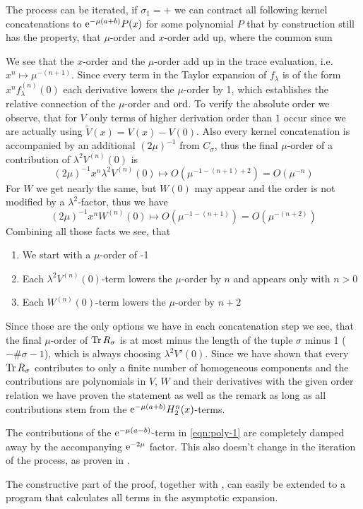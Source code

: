 \begin{MainTheorem}
\begin{Proof}
    The process can be iterated, if $\sigma_1 = +$ we can contract all following
    kernel concatenations to $\mathrm e^{-\mu(a+b)} P(x)$ for some polynomial $P$ that
    by construction still has the property, that $\mu$-order and $x$-order add
    up, where the common sum 

    We see that the $x$-order and the $\mu$-order add up in the trace
    evaluation, i.e.\ $x^n \mapsto \mu^{-(n+1)}$. Since every term in the Taylor
    expansion of $f_\lambda$ is of the form $x^n f^{(n)}_\lambda(0)$ each
    derivative lowers the $\mu$-order by 1, which establishes the relative
    connection of the $\mu$-order and $\operatorname{ord}$. To verify the absolute order we
    observe, that for $V$ only terms of higher derivation order than $1$ occur
    since we are actually using $\tilde V(x) = V(x) - V(0)$. Also every kernel
    concatenation is accompanied by an additional $(2\mu)^{-1}$ from $C_\sigma$,
    thus the final $\mu$-order of a contribution of $\lambda^2 V^{(n)}(0)$ is
    \begin{equation*}
      (2\mu)^{-1} x^n \lambda^2 V^{(n)}(0) \mapsto O(\mu^{-1-(n+1)+2}) =
      O(\mu^{-n})
    \end{equation*}
    For $W$ we get nearly the same, but $W(0)$ may appear and the order is not
    modified by a $\lambda^2$-factor, thus we have
    \begin{equation*}
      (2\mu)^{-1} x^n W^{(n)}(0) \mapsto O(\mu^{-1-(n+1)}) = O(\mu^{-(n+2)})
    \end{equation*}
    Combining all those facts we see, that 
    \begin{enumerate}
      \item We start with a $\mu$-order of -1
      \item Each $\lambda^2 V^{(n)}(0)$-term lowers the $\mu$-order by $n$ and
        appears only with $n > 0$
      \item Each $W^{(n)}(0)$-term lowers the $\mu$-order by $n+2$
    \end{enumerate}
    Since those are the only options we have in each concatenation step we see,
    that the final $\mu$-order of $\operatorname{Tr} R_\sigma$ is at most minus the length of
    the tuple $\sigma$ minus 1 ($-\#{\sigma}-1$), which is always choosing
    $\lambda^2 V'(0)$. Since we have shown that every $\operatorname{Tr} R_\sigma$ contributes
    to only a finite number of homogeneous components and the contributions are
    polynomials in $V$, $W$ and their derivatives with the given order relation
    we have proven the statement as well as the remark as long as all
    contributions stem from the $\mathrm e^{-\mu(a+b)}H^n_2(x)$-terms.

    The contributions of the $\mathrm e^{-\mu(a-b)}$-term in \cref{eqn:poly-1} are
    completely damped away by the accompanying $\mathrm e^{-2\mu}$ factor. This also
    doesn't change in the iteration of the process, as proven in
    .
  \end{Proof}
\end{MainTheorem}
The constructive part of the proof, together with , can
easily be extended to a program that calculates all terms in the asymptotic
expansion.
